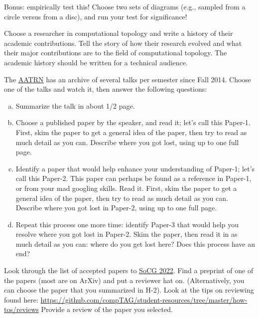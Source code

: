 \documentclass{article}
\begin{document}
Bonus: empirically test this!  Choose two sets of diagrams (e.g., sampled from a
circle versus from a disc), and run your test for significance!


Choose a researcher in computational topology and write a history of their
academic contributions.  Tell the story of how their research evolved and what
their major contributions are to the field of computational topology.  The
academic history should be written for a technical audience.

The \href{https://topology.ima.umn.edu/seminars}{AATRN} has an archive of
several talks per semester since Fall 2014.  Choose one of the talks and
watch it, then answer the following questions:
\begin{enumerate}[(a)]
    \item Summarize the talk in about 1/2 page.
    \item Choose a published paper by the speaker, and read it; let's
        call this Paper-1.  First,
        skim the paper to get a general idea of the paper, then try to
        read as much detail as you can.  Describe where you got lost,
        using up to one full page.
    \item Identify a paper that would help enhance your understanding of
        Paper-1; let's call this Paper-2.  This paper can perhaps be
        found as a reference in Paper-1, or from your mad googling
        skills. Read it. First,
        skim the paper to get a general idea of the paper, then try to
        read as much detail as you can.  Describe where you got lost in
        Paper-2,
        using up to one full page.
    \item Repeat this process one more time: identify Paper-3 that would
        help you resolve where you got lost in Paper-2. Skim the paper,
        then read it in as much detail as you can: where do you get lost
        here?  Does this process have an end?
\end{enumerate}

Look through the list of accepted papers to \href{https://www.inf.fu-berlin.de/inst/ag-ti/socg22/socg.html}{SoCG 2022}.  Find a preprint
of one of the papers (most are on ArXiv) and put a reviewer hat on.  (Alternatively, you can choose
the paper that you summarized in H-2).  Look at the tips on reviewing found
here:
\url{https://github.com/compTAG/student-resources/tree/master/how-tos/reviews}
Provide a review of the paper you selected.
\end{document}
